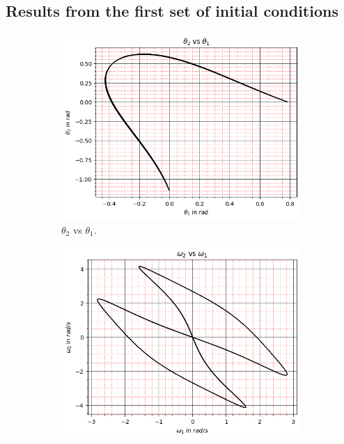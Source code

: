 \subsection{Results from the first set of initial conditions}\label{subsec:results-from-the-first-set-of-initial-conditions}
\begin{figure}[H]
    \centering
    \begin{subfigure}[b]{0.49\textwidth}
        \centering
        \includegraphics[width=\textwidth]{figures/initial-conditions-a/theta_2 vs theta_1.png}
        \caption{$\theta_2$ vs $\theta_1$.}
        \label{fig:2a}
    \end{subfigure}
    \hfill
    \begin{subfigure}[b]{0.49\textwidth}
        \centering
        \includegraphics[width=\textwidth]{figures/initial-conditions-a/omega_2 vs omega_1.png}

\end{subfigure}
\end{figure}
